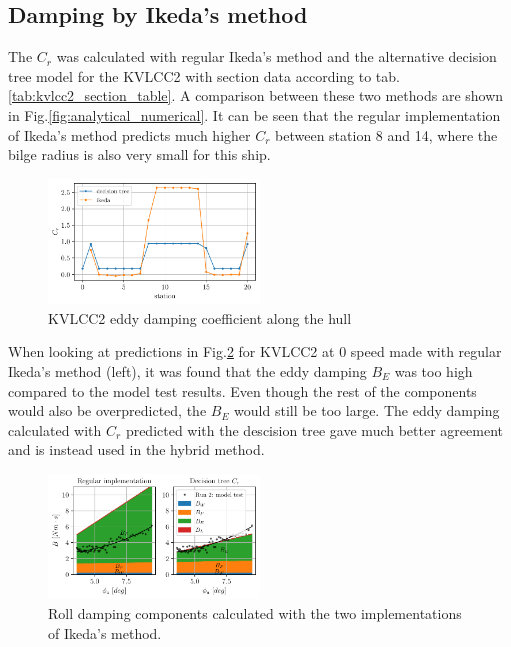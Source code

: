     \subsection*{Damping by Ikeda's method}\label{damping-by-ikedas-method}

    The $C_r$ was calculated with regular Ikeda's method and the
alternative decision tree model for the KVLCC2 with section data
according to tab.\ref{tab:kvlcc2_section_table}. A comparison
between these two methods are shown in
Fig.\ref{fig:analytical_numerical}. It can be seen that the
regular implementation of Ikeda's method predicts much higher $C_r$
between station 8 and 14, where the bilge radius is also very small for
this ship.

    

    \begin{figure}[H]
        \begin{center}\includegraphics[width = 0.5\textwidth]{figures/kvlcc2_eddy.pdf}\end{center}
        \vspace{-1cm}
        \caption{KVLCC2 eddy damping coefficient along the hull}
        \label{fig:kvlcc2_eddy}
    \end{figure}
    
    When looking at predictions in Fig.\ref{fig:ikeda} for KVLCC2 at
0 speed made with regular Ikeda's method (left), it was found that the
eddy damping $B_E$ was too high compared to the model test results.
Even though the rest of the components would also be overpredicted, the
$B_E$ would still be too large. The eddy damping calculated with
$C_r$ predicted with the descision tree gave much better agreement and
is instead used in the hybrid method.

    

    \begin{figure}[H]
        \begin{center}\includegraphics[width = 0.5\textwidth]{figures/ikeda.pdf}\end{center}
        \vspace{-1cm}
        \caption{Roll damping components calculated with the two implementations of Ikeda's method.}
        \label{fig:ikeda}
    \end{figure}
    
